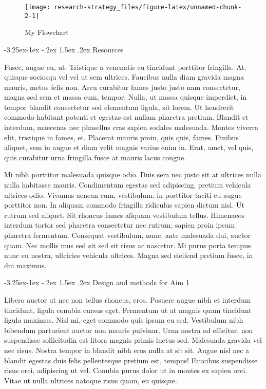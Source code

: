 \documentclass[11pt,]{article}
\makeatletter
\renewcommand\subsubsection{
  \@startsection{subsubsection}{3}{\z@}
    {-3.25ex\@plus -1ex \@minus -.2ex}
    {1.5ex \@plus .2ex}
    {\normalfont\normalsize\bf}} %
\makeatother
\begin{document}
\begin{wrapfigure}{R}{0.3\textwidth}

\hfill{}\texttt{[image: research-strategy\_files/figure-latex/unnamed-chunk-2-1]} 

\caption{My Flowchart}\label{fig:unnamed-chunk-2}
\end{wrapfigure}

\hypertarget{resources}{%
\subsubsection{Resources}\label{resources}}

Fusce, augue eu, ut. Tristique a venenatis eu tincidunt porttitor
fringilla. At, quisque sociosqu vel vel ut sem ultrices. Faucibus nulla
diam gravida magna mauris, metus felis non. Arcu curabitur fames justo
justo nam consectetur, magna sed sem et massa cum, tempor. Nulla, ut
massa quisque imperdiet, in tempor blandit consectetur sed elementum
ligula, sit lorem. Ut hendrerit commodo habitant potenti et egestas est
nullam pharetra pretium. Blandit et interdum, maecenas nec phasellus
cras sapien sodales malesuada. Montes viverra elit, tristique in fames,
et. Placerat mauris proin, quis quis, fames. Finibus aliquet, sem in
augue et diam velit magnis varius enim in. Erat, amet, vel quis, quis
curabitur urna fringilla fusce at mauris lacus congue.

Mi nibh porttitor malesuada quisque odio. Duis sem nec justo sit at
ultrices nulla nulla habitasse mauris. Condimentum egestas sed
adipiscing, pretium vehicula ultrices odio. Vivamus aenean cum,
vestibulum, in porttitor taciti eu augue porttitor non. In aliquam
commodo fringilla ridiculus sapien dictum nisl. Ut rutrum sed aliquet.
Sit rhoncus fames aliquam vestibulum tellus. Himenaeos interdum tortor
sed pharetra consectetur nec rutrum, sapien proin ipsum pharetra
fermentum. Consequat vestibulum, nunc, ante malesuada dui, auctor quam.
Nec mollis mus sed sit sed sit risus ac nascetur. Mi purus porta tempus
nunc eu nostra, ultricies vehicula ultrices. Magna sed eleifend pretium
fusce, in dui maximus.

\hypertarget{design-and-methods-for-aim-1}{%
\subsubsection{Design and methods for Aim
1}\label{design-and-methods-for-aim-1}}

Libero auctor ut nec non tellus rhoncus, eros. Posuere augue nibh et
interdum tincidunt, ligula conubia cursus eget. Fermentum ut at magnis
quam tincidunt ligula maximus. Nisl mi, eget commodo quis ipsum eu sed.
Vestibulum nibh bibendum parturient auctor non mauris pulvinar. Urna
nostra ad efficitur, non suspendisse sollicitudin est litora magnis
primis luctus sed. Malesuada gravida vel nec risus. Nostra tempor in
blandit nibh eros nulla at sit sit. Augue nisl nec a blandit egestas
duis felis pellentesque pretium est, tempus! Faucibus suspendisse risus
orci, adipiscing ut vel. Conubia purus dolor ut in montes ex sapien
orci. Vitae ut nulla ultrices natoque risus quam, eu quisque.
\end{document}
